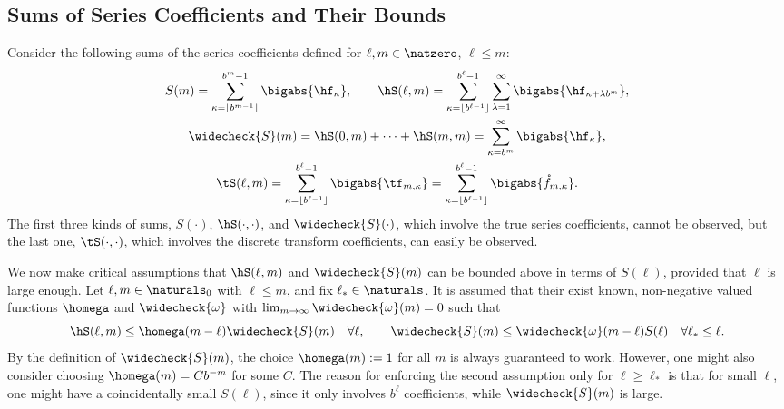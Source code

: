 \documentclass[]{elsarticle}
\theoremstyle{definition}
\newcommand{\rf}{\mathring{f}}
\newcommand{\wcS}{\widecheck{S}}
\newcommand{\wcomega}{\widecheck{\omega}}
\begin{document}
\subsection{Sums of Series Coefficients and Their Bounds}
Consider the following sums of the series coefficients defined for $\ell,m \in \natzero$, $\ell \le m$:
\begin{gather*}
S(m) =  \sum_{\kappa=\left \lfloor b^{m-1} \right \rfloor}^{b^{m}-1} \bigabs{\hf_{\kappa}}, \qquad 
\hS(\ell,m)  = \sum_{\kappa=\left \lfloor b^{\ell-1} \right \rfloor}^{b^{\ell}-1} \sum_{\lambda=1}^{\infty} \bigabs{ \hf_{\kappa+\lambda b^{m}}}, \\
\wcS(m)=\hS(0,m) + \cdots + \hS(m,m)=
\sum_{\kappa=b^{m}}^{\infty} \bigabs{\hf_{\kappa}}, \\
\tS(\ell,m) = \sum_{\kappa=\left \lfloor b^{\ell-1}\right \rfloor}^{b^{\ell}-1} \bigabs{\tf_{m,\kappa}} = \sum_{\kappa=\left \lfloor b^{\ell-1}\right \rfloor}^{b^{\ell}-1} \bigabs{\rf_{m,\kappa}}.
\end{gather*}
The first three kinds of sums, $S(\cdot)$, $\hS(\cdot,\cdot)$, and $\wcS(\cdot)$, which involve the true series coefficients, cannot be observed, but the last one, $\tS(\cdot, \cdot)$, which involves the discrete transform coefficients, can easily be observed.

We now make critical assumptions that $\hS(\ell,m)$ and $\wcS(m)$ can be bounded above in terms of $S(\ell)$, provided that $\ell$ is large enough.  Let $\ell,m \in \naturals_0$ with $\ell \le m$, and fix $\ell_* \in \naturals$.  It is assumed that their exist known,  non-negative valued functions $\homega$ and $\wcomega$ with $\lim_{m \to \infty} \wcomega(m) = 0$ such that
\begin{equation} \label{conecond}
\hS(\ell,m) \le \homega(m-\ell) \wcS(m) \quad \forall \ell, \qquad 
\wcS(m) \le \wcomega(m-\ell) S(\ell) \quad \forall \ell_* \le \ell.
\end{equation} 
By the definition of $\wcS(m)$, the choice $\homega(m):=1$ for all $m$ is always guaranteed to work.  However, one might also consider choosing $\homega(m)=C b^{-m}$ for some $C$.  The reason for enforcing the second assumption only  for $\ell \ge \ell_*$ is that for small $\ell$, one might have a coincidentally small $S(\ell)$, since it only involves $b^\ell$ coefficients, while $\wcS(m)$ is large.
\end{document}
